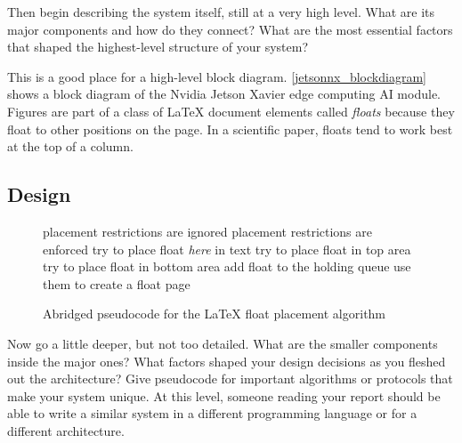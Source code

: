 \documentclass[
	conference,	%
]{IEEEtran}
\newcommand{\newterm}[1]{\textit{#1}}
\begin{document}
Then begin describing the system itself, still at a very high level.
What are its major components and how do they connect?
What are the most essential factors that shaped the highest-level
structure of your system?

This is a good place for a high-level block diagram.
\autoref{jetsonnx_blockdiagram} shows a block diagram of the
Nvidia Jetson Xavier edge computing AI module.
Figures are part of a class of
{\LaTeX} document elements called \newterm{floats}
because they float to other positions on the page.
In a scientific paper, floats tend to work best at the top of a column.


\subsection{Design}
\label{design}

\begin{figure}[t]
	\begin{algorithmic}[1]
				\State placement restrictions are ignored
			\Else
				\State placement restrictions are enforced
			\EndIf
				\State try to place float \emph{here} in text
			\EndIf
				\State try to place float in top area
			\EndIf
				\State try to place float in bottom area
			\EndIf
				\State add float to the holding queue
			\EndIf
		\EndProcedure
					\State use them to create a float page
				\EndIf
			\EndIf
			\EndIf
		\EndProcedure
	\end{algorithmic}
	\caption{Abridged pseudocode for the {\LaTeX} float placement
		algorithm~\cite{Mittelbach2014FloatAlgorithm}}
	\label{floatplacement}
\end{figure}

Now go a little deeper, but not too detailed.
What are the smaller components inside the major ones?
What factors shaped your design decisions as you fleshed out the
architecture?
Give pseudocode for important algorithms or protocols that make your
system unique.
At this level, someone reading your report should be able to write
a similar system in a different programming language or for a different
architecture.
\end{document}

